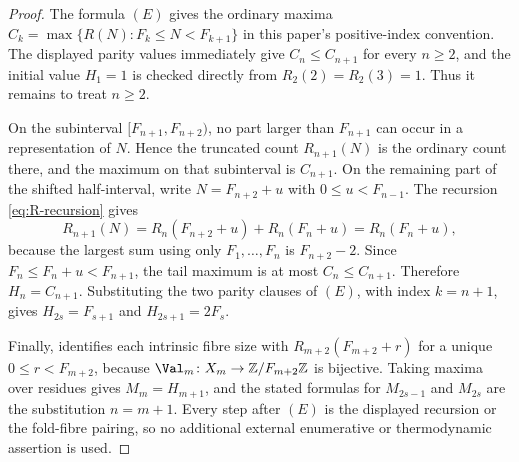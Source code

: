 \begin{proof}
The formula \((E)\) gives the ordinary maxima
\(C_k=\max\{R(N):F_k\le N<F_{k+1}\}\) in this paper's positive-index convention.
The displayed parity values immediately give \(C_n\le C_{n+1}\) for every
\(n\ge2\), and the initial value \(H_1=1\) is checked directly from
\(R_2(2)=R_2(3)=1\).  Thus it remains to treat \(n\ge2\).

On the subinterval \([F_{n+1},F_{n+2})\), no part larger than \(F_{n+1}\) can occur
in a representation of \(N\).  Hence the truncated count \(R_{n+1}(N)\) is the
ordinary count there, and the maximum on that subinterval is \(C_{n+1}\).  On the
remaining part of the shifted half-interval, write
\(N=F_{n+2}+u\) with \(0\le u<F_{n-1}\).  The recursion
\eqref{eq:R-recursion} gives
\[
  R_{n+1}(N)=R_n(F_{n+2}+u)+R_n(F_n+u)=R_n(F_n+u),
\]
because the largest sum using only \(F_1,\ldots,F_n\) is \(F_{n+2}-2\).  Since
\(F_n\le F_n+u<F_{n+1}\), the tail maximum is at most \(C_n\le C_{n+1}\).  Therefore
\(H_n=C_{n+1}\).  Substituting the two parity clauses of \((E)\), with index
\(k=n+1\), gives \(H_{2s}=F_{s+1}\) and \(H_{2s+1}=2F_s\).

Finally,  identifies each intrinsic
fibre size with \(R_{m+2}(F_{m+2}+r)\) for a unique
\(0\le r<F_{m+2}\), because \(\Val_m\colon X_m\to
\mathbb Z/F_{m+2}\mathbb Z\) is bijective.  Taking maxima over residues gives
\(M_m=H_{m+1}\), and the stated formulas for \(M_{2s-1}\) and \(M_{2s}\) are the
substitution \(n=m+1\).  Every step after \((E)\) is the displayed recursion or
the fold-fibre pairing, so no additional external enumerative or thermodynamic
assertion is used.
\end{proof}


